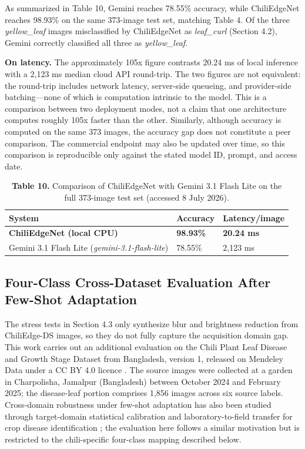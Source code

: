 As summarized in Table 10, Gemini reaches 78.55\% accuracy, while ChiliEdgeNet reaches 98.93\% on the same 373-image test set, matching Table 4. Of the three \emph{yellow\_leaf} images misclassified by ChiliEdgeNet as \emph{leaf\_curl} (Section 4.2), Gemini correctly classified all three as \emph{yellow\_leaf}.

\textbf{On latency.} The approximately 105x figure contrasts 20.24 ms of local inference with a 2,123 ms median cloud API round-trip. The two figures are not equivalent: the round-trip includes network latency, server-side queueing, and provider-side batching---none of which is computation intrinsic to the model. This is a comparison between two deployment modes, not a claim that one architecture computes roughly 105x faster than the other. Similarly, although accuracy is computed on the same 373 images, the accuracy gap does not constitute a peer comparison. The commercial endpoint may also be updated over time, so this comparison is reproducible only against the stated model ID, prompt, and access date.

\begin{table}[H]
\centering
\caption*{\textbf{Table 10.} Comparison of ChiliEdgeNet with Gemini 3.1 Flash Lite on the full 373-image test set (accessed 8 July 2026).}
\label{tab:10}
\footnotesize
\renewcommand{\arraystretch}{1.15}
\begin{tabular}{lll}
\toprule
\textbf{System} & \textbf{Accuracy} & \textbf{Latency/image} \\
\midrule
\textbf{ChiliEdgeNet (local CPU)} & \textbf{98.93\%} & \textbf{20.24 ms} \\
Gemini 3.1 Flash Lite (\emph{gemini-3.1-flash-lite}) & 78.55\% & 2,123 ms \\
\bottomrule
\end{tabular}
\end{table}

\subsection{Four-Class Cross-Dataset Evaluation After Few-Shot Adaptation}\label{four-class-cross-dataset-evaluation-after-few-shot-adaptation}

The stress tests in Section 4.3 only synthesize blur and brightness reduction from ChiliEdge-DS images, so they do not fully capture the acquisition domain gap. This work carries out an additional evaluation on the Chili Plant Leaf Disease and Growth Stage Dataset from Bangladesh, version 1, released on Mendeley Data under a CC BY 4.0 licence \cite{nirob2025}. The source images were collected at a garden in Charpolisha, Jamalpur (Bangladesh) between October 2024 and February 2025; the disease-leaf portion comprises 1,856 images across six source labels. Cross-domain robustness under few-shot adaptation has also been studied through target-domain statistical calibration \cite{zhao2026} and laboratory-to-field transfer for crop disease identification \cite{yangS2024}; the evaluation here follows a similar motivation but is restricted to the chili-specific four-class mapping described below.

